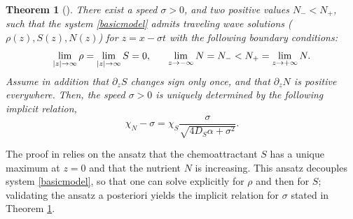\documentclass[11pt,twoside]{article}
\numberwithin{equation}{section}
\DeclareMathOperator{\sign}{sign}
\theoremstyle{plain}
\newtheorem{theorem}{Theorem}[section]
\theoremstyle{nonumberplain}
\begin{document}
{\begin{theorem}[\cite{calvez2019chemotactic}]\label{thmacro}
There exist a speed $\sigma>0$, and two positive values $N_- < N_+$, such that the system \eqref{basicmodel} admits traveling wave solutions ($\rho (z), S(z), N(z)$) for $z=x - \sigma t$ with the following boundary conditions:
\begin{equation}
    \lim_{|z| \to \infty} \rho = \lim_{|z| \to \infty} S = 0, \hspace{0.6cm} \lim_{z \to -\infty} N = N_- < N_+ = \lim_{z \to + \infty} N.
    \nonumber
\end{equation}
Assume in addition that $\partial_z S$ changes sign only once, and that $\partial_z N$ is positive everywhere. Then, the speed $\sigma > 0$ is uniquely determined by the following implicit relation,
\[
\chi_N - \sigma = \chi_S \frac{\sigma}{\sqrt{4 D_S \alpha + \sigma^2}}.
\]
\end{theorem}
The proof in \cite{calvez2019chemotactic} relies on the ansatz that the chemoattractant $S$ has a unique maximum at $z=0$ and that the nutrient $N$ is increasing. This ansatz decouples system \eqref{basicmodel}, so that one can solve explicitly for $\rho$ and then for $S$; validating the ansatz a posteriori yields the implicit relation for $\sigma$ stated in Theorem \ref{thmacro}.

}
\end{document}
